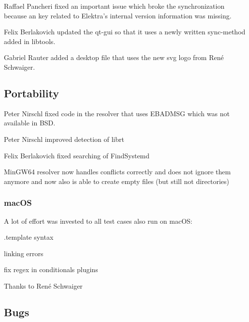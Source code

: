 Raffael Pancheri fixed an important issue which broke the synchronization because an key related to Elektra’s internal version information was missing.

Felix Berlakovich updated the qt-\/gui so that it uses a newly written sync-\/method added in libtools.

Gabriel Rauter added a desktop file that uses the new svg logo from René Schwaiger.

\subsection*{Portability}


\begin{DoxyItemize}
\item Peter Nirschl fixed code in the resolver that uses E\+B\+A\+D\+M\+SG which was not available in B\+SD.
\item Peter Nirschl improved detection of librt
\item Felix Berlakovich fixed searching of Find\+Systemd
\item Min\+G\+W64 resolver now handles conflicts correctly and does not ignore them anymore and now also is able to create empty files (but still not directories)
\end{DoxyItemize}

\subsubsection*{mac\+OS}

A lot of effort was invested to all test cases also run on mac\+OS\+:


\begin{DoxyItemize}
\item .template syntax
\item linking errors
\item fix regex in conditionals plugins
\end{DoxyItemize}

Thanks to René Schwaiger

\subsection*{Bugs}


